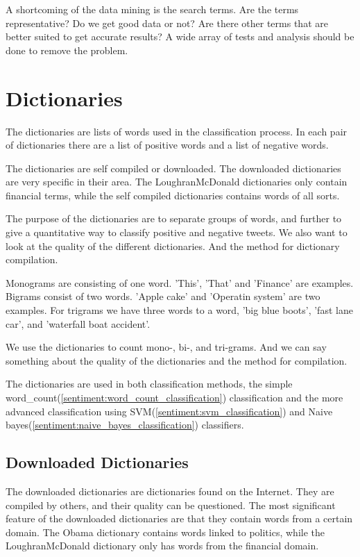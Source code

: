 A shortcoming of the data mining is the search terms. Are the terms
representative? Do we get good data or not? Are there other terms that are
better suited to get accurate results? A wide array of tests and analysis should
be done to remove the problem. 
%

\section{Dictionaries}\label{data:dictionaries}

The dictionaries are lists of words used in the classification process. In each
pair of dictionaries there are a list of positive words and a list of negative
words.

The dictionaries are self compiled or downloaded. The downloaded dictionaries
are very specific in their area. The LoughranMcDonald dictionaries only contain
financial terms, while the self compiled dictionaries contains words of all
sorts. 

The purpose of the dictionaries are to separate groups of words, and
further to give a quantitative way to classify positive and negative tweets.
We also want to look at the quality of the different dictionaries. And the
method for dictionary compilation.  

Monograms are consisting of one word. 'This', 'That' and 'Finance' are
examples. Bigrams consist of two words. 'Apple cake' and
'Operatin system' are two examples. For trigrams we have three words to a word,
'big blue boots', 'fast lane car', and 'waterfall boat accident'. 

We use the dictionaries to count mono-, bi-, and tri-grams.
And we can say something about the quality of the dictionaries and the method
for compilation.

The dictionaries are used in both classification methods, the simple
word\_count(\ref{sentiment:word_count_classification}) classification and the
more advanced classification using SVM(\ref{sentiment:svm_classification}) and
Naive bayes(\ref{sentiment:naive_bayes_classification}) classifiers. 
%

\subsection{Downloaded Dictionaries}
The downloaded dictionaries are dictionaries found on the Internet. They are
compiled by others, and their quality can be questioned. The most significant
feature of the downloaded dictionaries are that they contain words from a
certain domain. The Obama dictionary contains words linked to politics,
while the LoughranMcDonald dictionary only has words from the financial domain.  

